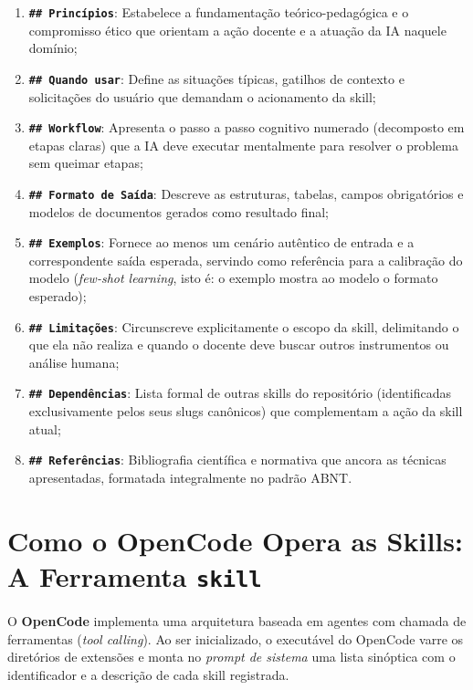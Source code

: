 \begin{enumerate}
  \item \textbf{\texttt{\#\# Princ{\'i}pios}}: Estabelece a fundamenta{\c c}{\~a}o te{\'o}rico-pedag{\'o}gica e o compromisso {\'e}tico que orientam a a{\c c}{\~a}o docente e a atua{\c c}{\~a}o da IA naquele dom{\'i}nio;
  \item \textbf{\texttt{\#\# Quando usar}}: Define as situa{\c c}{\~o}es t{\'i}picas, gatilhos de contexto e solicita{\c c}{\~o}es do usu{\'a}rio que demandam o acionamento da skill;
  \item \textbf{\texttt{\#\# Workflow}}: Apresenta o passo a passo cognitivo numerado (decomposto em etapas claras) que a IA deve executar mentalmente para resolver o problema sem queimar etapas;
  \item \textbf{\texttt{\#\# Formato de Sa{\'i}da}}: Descreve as estruturas, tabelas, campos obrigat{\'o}rios e modelos de documentos gerados como resultado final;
  \item \textbf{\texttt{\#\# Exemplos}}: Fornece ao menos um cen{\'a}rio aut{\^e}ntico de entrada e a correspondente sa{\'i}da esperada, servindo como refer{\^e}ncia para a calibra{\c c}{\~a}o do modelo (\emph{few-shot learning}, isto {\'e}: o exemplo mostra ao modelo o formato esperado);
  \item \textbf{\texttt{\#\# Limita{\c c}{\~o}es}}: Circunscreve explicitamente o escopo da skill, delimitando o que ela n{\~a}o realiza e quando o docente deve buscar outros instrumentos ou an{\'a}lise humana;
  \item \textbf{\texttt{\#\# Depend{\^e}ncias}}: Lista formal de outras skills do reposit{\'o}rio (identificadas exclusivamente pelos seus slugs can{\^o}nicos) que complementam a a{\c c}{\~a}o da skill atual;
  \item \textbf{\texttt{\#\# Refer{\^e}ncias}}: Bibliografia cient{\'i}fica e normativa que ancora as t{\'e}cnicas apresentadas, formatada integralmente no padr{\~a}o ABNT.
\end{enumerate}

\section{Como o OpenCode Opera as Skills: A Ferramenta \texttt{skill}}

O \textbf{OpenCode} implementa uma arquitetura baseada em agentes com chamada de ferramentas (\emph{tool calling}). Ao ser inicializado, o execut{\'a}vel do OpenCode varre os diret{\'o}rios de extens{\~o}es e monta no \emph{prompt de sistema} uma lista sin{\'o}ptica com o identificador e a descri{\c c}{\~a}o de cada skill registrada.

